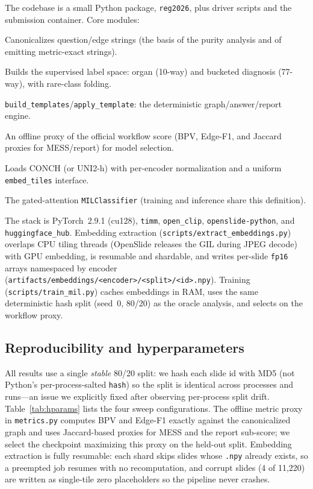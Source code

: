 \documentclass[11pt,a4paper]{article}
\newcommand{\code}[1]{\texttt{\small #1}}
\begin{document}
The codebase is a small Python package, \code{reg2026}, plus driver scripts and the submission
container. Core modules:
\begin{description}[leftmargin=1.2em,style=nextline,itemsep=1pt]
  \item[\code{canon.py}] Canonicalizes question/edge strings (the basis of the purity analysis
        and of emitting metric-exact strings).
  \item[\code{labels.py}] Builds the supervised label space: organ (10-way) and bucketed
        diagnosis (77-way), with rare-class folding.
  \item[\code{templates.py}] \code{build\_templates}/\code{apply\_template}: the deterministic
        graph/answer/report engine.
  \item[\code{metrics.py}] An offline proxy of the official workflow score (BPV, Edge-F1, and
        Jaccard proxies for MESS/report) for model selection.
  \item[\code{encoder.py}] Loads CONCH (or UNI2-h) with per-encoder normalization and a uniform
        \code{embed\_tiles} interface.
  \item[\code{mil.py}] The gated-attention \code{MILClassifier} (training and inference share
        this definition).
\end{description}
The stack is PyTorch~2.9.1 (cu128), \code{timm}, \code{open\_clip}, \code{openslide-python}, and
\code{huggingface\_hub}. Embedding extraction (\code{scripts/extract\_embeddings.py}) overlaps
CPU tiling threads (OpenSlide releases the GIL during JPEG decode) with GPU embedding, is
resumable and shardable, and writes per-slide \code{fp16} arrays namespaced by encoder
(\code{artifacts/embeddings/<encoder>/<split>/<id>.npy}). Training
(\code{scripts/train\_mil.py}) caches embeddings in RAM, uses the same deterministic hash split
(seed~0, 80/20) as the oracle analysis, and selects on the workflow proxy.

\subsection{Reproducibility and hyperparameters}
\label{sec:repro}
All results use a single \emph{stable} 80/20 split: we hash each slide id with MD5 (not Python's
per-process-salted \code{hash}) so the split is identical across processes and runs---an issue we
explicitly fixed after observing per-process split drift. Table~\ref{tab:hparams} lists the four
sweep configurations. The offline metric proxy in \code{metrics.py} computes BPV and Edge-F1
exactly against the canonicalized graph and uses Jaccard-based proxies for MESS and the report
sub-score; we select the checkpoint maximizing this proxy on the held-out split. Embedding
extraction is fully resumable: each shard skips slides whose \code{.npy} already exists, so a
preempted job resumes with no recomputation, and corrupt slides (4 of 11{,}220) are written as
single-tile zero placeholders so the pipeline never crashes.
\end{document}
